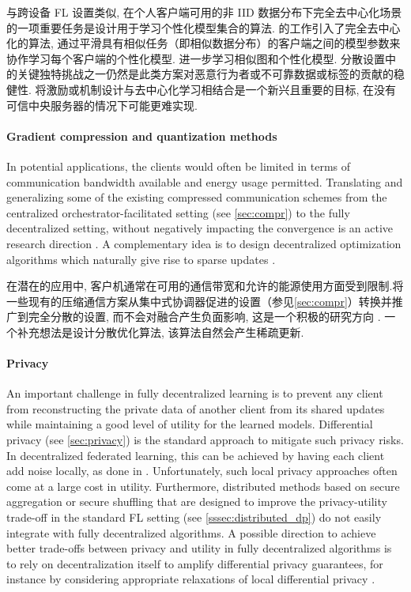 与跨设备 FL 设置类似, 在个人客户端可用的非 IID 数据分布下完全去中心化场景的一项重要任务是设计用于学习个性化模型集合的算法. \citep{Vanhaesebrouck2017,Bellet2018a} 的工作引入了完全去中心化的算法, 通过平滑具有相似任务（即相似数据分布）的客户端之间的模型参数来协作学习每个客户端的个性化模型. \citet{Zantedeschi2019} 进一步学习相似图和个性化模型. 分散设置中的关键独特挑战之一仍然是此类方案对恶意行为者或不可靠数据或标签的贡献的稳健性. 将激励或机制设计与去中心化学习相结合是一个新兴且重要的目标, 在没有可信中央服务器的情况下可能更难实现.

\paragraph{Gradient compression and quantization methods}
In potential applications, the clients would often be limited in terms of communication bandwidth available and energy usage permitted. Translating and generalizing some of the existing compressed communication schemes from the centralized orchestrator-facilitated setting (see \cref{sec:compr}) to the fully decentralized setting, without negatively impacting the convergence is an active research direction \citep{Koloskova2019, reisizadeh2019robust, tang2019texttt, koloskova2019deep}.
A complementary idea is to design decentralized optimization algorithms which naturally give rise to sparse updates \citep{Zantedeschi2019}.

在潜在的应用中, 客户机通常在可用的通信带宽和允许的能源使用方面受到限制.将一些现有的压缩通信方案从集中式协调器促进的设置（参见\cref{sec:compr}）转换并推广到完全分散的设置, 而不会对融合产生负面影响, 这是一个积极的研究方向 \citep{Koloskova2019, reisizadeh2019robust, tang2019texttt, koloskova2019deep}. 一个补充想法是设计分散优化算法, 该算法自然会产生稀疏更新.

\paragraph{Privacy}
An important challenge in fully decentralized learning is to prevent any client from reconstructing the private data of another client from its shared updates while maintaining a good level of utility for the learned models. Differential privacy (see \cref{sec:privacy}) is the standard approach to mitigate such privacy risks. In decentralized federated learning, this can be achieved by having each client add noise locally, as done in \citep{Huang2015a,Bellet2018a}. Unfortunately, such local privacy approaches often come at a large cost in utility. Furthermore, distributed methods based on secure aggregation or secure shuffling that are designed to improve the privacy-utility trade-off in the standard FL setting (see \cref{sssec:distributed_dp}) do not easily integrate with fully decentralized algorithms. A possible direction to achieve better trade-offs between privacy and utility in fully decentralized algorithms is to rely on decentralization itself to amplify differential privacy guarantees, for instance by considering appropriate relaxations of local differential privacy \cite{privacy_amp_by_decentralization}.

